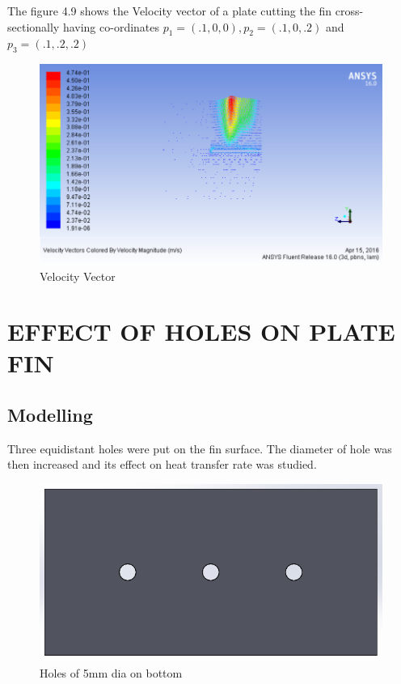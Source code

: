 The figure 4.9 shows the Velocity vector of a plate cutting the fin cross-sectionally having co-ordinates $ p_1 = (.1,0,0) , p_2 = (.1,0,.2) $ and $ p_3 = (.1,.2,.2) $


\begin{figure}[h]
	\label{ss}    %
	\centering
	\includegraphics[width= 11 cm]{112.png}
	\caption{Velocity Vector}
\end{figure}









\chapter{EFFECT OF HOLES ON PLATE FIN}

\section{Modelling}

Three equidistant holes were put on the fin surface. The diameter of hole was then increased and its effect on heat transfer rate was studied. 

\begin{figure}[h]
	\label{ss}    %
	\centering
	\includegraphics[width= 11 cm]{113.png}
	\caption{Holes of 5mm dia on bottom}
\end{figure}

